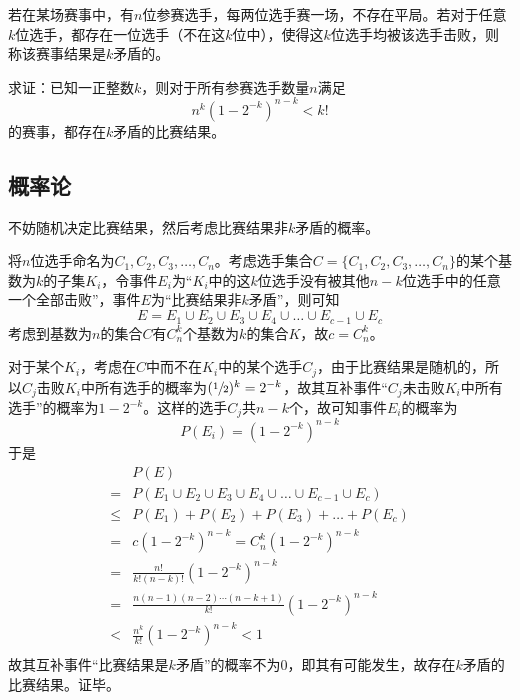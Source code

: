 

若在某场赛事中，有$n$位参赛选手，每两位选手赛一场，不存在平局。若对于任意$k$位选手，都存在一位选手（不在这$k$位中），使得这$k$位选手均被该选手击败，则称该赛事结果是$k$矛盾的。

求证：已知一正整数$k$，则对于所有参赛选手数量$n$满足
\[ n^k\left(1 - 2^{-k}\right)^{n - k} < k! \]
的赛事，都存在$k$矛盾的比赛结果。

\subsection{概率论}

不妨随机决定比赛结果，然后考虑比赛结果非$k$矛盾的概率。

将$n$位选手命名为$C_1, C_2, C_3, \dots, C_n$。考虑选手集合$C = \{C_1, C_2, C_3, \dots, C_n\}$的某个基数为$k$的子集$K_i$，令事件$E_i$为“$K_i$中的这$k$位选手没有被其他$n - k$位选手中的任意一个全部击败”，事件$E$为“比赛结果非$k$矛盾”，则可知
\[ E = E_1 \cup E_2 \cup E_3 \cup E_4 \cup \dots \cup E_{c - 1} \cup E_c \]
考虑到基数为$n$的集合$C$有$C_n^k$个基数为$k$的集合$K$，故$c = C_n^k$。

对于某个$K_i$，考虑在$C$中而不在$K_i$中的某个选手$C_j$，由于比赛结果是随机的，所以$C_j$击败$K_i$中所有选手的概率为$(\sfrac12)^k = 2^{-k}$，故其互补事件“$C_j$未击败$K_i$中所有选手”的概率为$1 - 2^{-k}$。这样的选手$C_j$共$n - k$个，故可知事件$E_i$的概率为
\[ P(E_i) = \left(1 - 2^{-k}\right)^{n - k} \]
于是
\begin{align*}
  & P(E) \\
  ={}& P(E_1 \cup E_2 \cup E_3 \cup E_4 \cup \dots \cup E_{c - 1} \cup E_c) \\
  \le{}& P(E_1) + P(E_2) + P(E_3) + \dots + P(E_c) \\
  ={}& c\left(1 - 2^{-k}\right)^{n - k} = C_n^k\left(1 - 2^{-k}\right)^{n - k} \\
  ={}& \frac{n!}{k!(n - k)!}\left(1 - 2^{-k}\right)^{n - k} \\
  ={}& \frac{n(n - 1)(n - 2)\cdots(n - k + 1)}{k!}\left(1 - 2^{-k}\right)^{n - k} \\
  <{}& \frac{n^k}{k!}\left(1 - 2^{-k}\right)^{n - k} < 1 \\
\end{align*}
故其互补事件“比赛结果是$k$矛盾”的概率不为0，即其有可能发生，故存在$k$矛盾的比赛结果。证毕。
